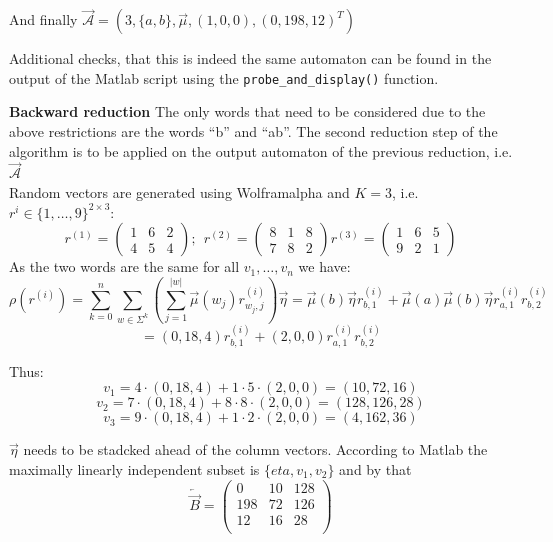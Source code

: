             
        And finally $\overrightarrow{\mathcal{A}} = (3, \{a, b\}, \overrightarrow{\mu}, (1,0,0), (0, 198, 12)^T)$

        Additional checks, that this is indeed the same automaton can be found in the output of the Matlab script using the \texttt{probe_and_display()} function. 
        \newpage
        
        
        \textbf{Backward reduction} The only words that need to be considered due to the above restrictions are the words ``b'' and ``ab''. The second reduction step of the algorithm is to be applied on the output automaton of the previous reduction, i.e. $\overrightarrow{\mathcal{A}}$ \\
        Random vectors are generated using Wolframalpha and $K=3$, i.e. $r^{i} \in \{1, \dots, 9\}^{2 \times 3}$:
        \[  r^{(1)}= \begin{pmatrix}
                        1 & 6 & 2 \\
                        4 & 5 & 4
                    \end{pmatrix}; \ \
            r^{(2)}= \begin{pmatrix}
                        8 & 1 & 8 \\
                        7 & 8 & 2
                    \end{pmatrix} 
            r^{(3)}= \begin{pmatrix}
                        1 & 6 & 5 \\
                        9 & 2 & 1
                    \end{pmatrix}                      
        \]
        As the two words are the same for all $v_1, \dots, v_n$ we have:
        \[ \rho(r^{(i)}) = \sum_{k=0}^{n} \sum_{w \in \Sigma^k} \left(\sum_{j=1}^{|w|} \overrightarrow{\mu}(w_j) r^{(i)}_{w_j, j} \right) \overrightarrow{\eta} = \overrightarrow{\mu}(b) \overrightarrow{\eta} r^{(i)}_{b, 1}  + \overrightarrow{\mu}(a) \overrightarrow{\mu}(b) \overrightarrow{\eta} r^{(i)}_{a, 1} r^{(i)}_{b, 2}  \]
        \[ = (0, 18, 4) r^{(i)}_{b, 1} + (2,0,0) r^{(i)}_{a, 1} r^{(i)}_{b, 2} \]
        
        Thus:
        \[ v_1 = 4 \cdot (0,18,4) + 1 \cdot 5 \cdot (2,0,0) = (10, 72, 16) \]
        \[ v_2 = 7 \cdot (0,18,4) + 8 \cdot 8 \cdot (2,0,0) = (128, 126, 28) \]
        \[ v_3 = 9 \cdot (0,18,4) + 1 \cdot 2 \cdot (2,0,0) = (4, 162, 36) \]
        
        $\overrightarrow{\eta}$ needs to be stadcked ahead of the column vectors. According to Matlab the maximally linearly independent subset is $\{eta, v_1, v_2\}$ and by that
        \[ \overleftarrow{\overrightarrow{B}} = \begin{pmatrix}
                                    0 & 10 & 128 \\
                                    198 & 72 & 126 \\
                                    12 & 16 & 28  \\
                                \end{pmatrix}
        \]
        
